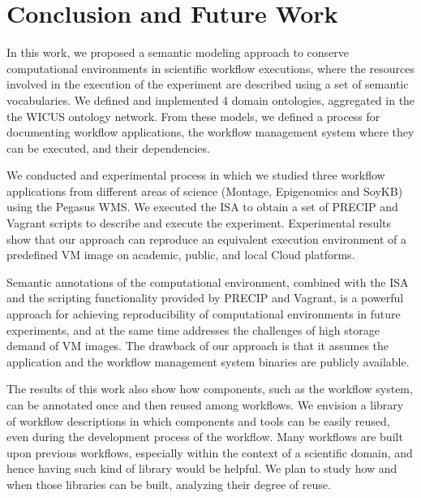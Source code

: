 \section{Conclusion and Future Work}
\label{sec:conclusion}



In this work, we proposed a semantic modeling approach to conserve computational environments in scientific workflow executions, where  the resources involved in the execution of the experiment are described using a set of semantic vocabularies. We defined and implemented 4 domain ontologies, aggregated in the the WICUS ontology network. From these models, we defined a process for documenting workflow applications, the workflow management system where they can be executed, and their dependencies. 

We conducted and experimental process in which we studied three workflow applications from different areas of science (Montage, Epigenomics and SoyKB) using the Pegasus WMS. We executed the ISA to obtain a set of PRECIP and Vagrant scripts to describe and execute the experiment. Experimental results show that our approach can reproduce an equivalent execution environment of a predefined VM image on academic, public, and local Cloud platforms.

Semantic annotations of the computational environment, combined with the ISA and the scripting functionality provided by PRECIP and Vagrant, is a powerful approach for achieving reproducibility of computational environments in future experiments, and at the same time addresses the challenges of high storage demand of VM images. The drawback of our approach is that it assumes the application and the workflow management system binaries are publicly available.

The results of this work also show how components, such as the workflow system, can be annotated once and then reused among workflows. We envision a library of workflow descriptions in which components and tools can be easily reused, even during the development process of the workflow. Many workflows are built upon previous workflows, especially within the context of a scientific domain, and hence having such kind of library would be helpful. We plan to study how and when those libraries can be built, analyzing their degree of reuse.

